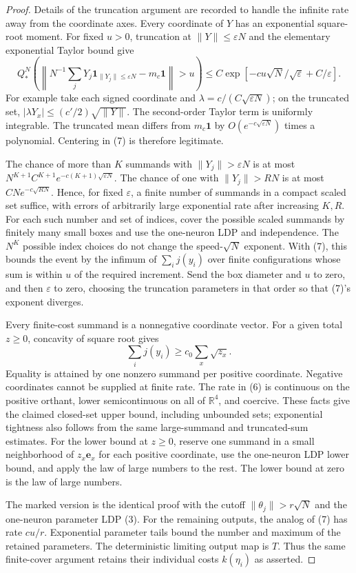 \documentclass[11pt]{article}
\newcommand{\R}{\mathbb R}\newcommand{\one}{\mathbf 1}
\begin{document}
\begin{proof}
Details of the truncation argument are recorded to handle the infinite
rate away from the coordinate axes. Every coordinate of $Y$ has an
exponential square-root moment. For fixed $u>0$, truncation at
$\|Y\|\le\varepsilon N$ and the elementary exponential Taylor bound
give
\[
 Q_*^N\left(\left\|N^{-1}\sum_j
 Y_j\one_{\|Y_j\|\le\varepsilon N}-m_c\one\right\|>u\right)
 \le C\exp[-c u\sqrt N/\sqrt\varepsilon+C/\varepsilon].       \tag{7}
\]
For example take each signed coordinate and
$\lambda=c/(C\sqrt{\varepsilon N})$; on the truncated set,
$|\lambda Y_x|\le(c'/2)\sqrt{\|Y\|}$.
The second-order Taylor term is uniformly integrable. The truncated
mean differs from $m_c\one$ by $O(e^{-c\sqrt{\varepsilon N}})$
times a polynomial. Centering in (7) is therefore legitimate.

The chance of more than $K$ summands with $\|Y_j\|>\varepsilon N$
is at most $N^{K+1}C^{K+1}e^{-c(K+1)\sqrt{\varepsilon N}}$.
The chance of one with $\|Y_j\|>RN$ is at most
$CN e^{-c\sqrt{RN}}$. Hence, for fixed $\varepsilon$, a finite
number of summands in a compact scaled set suffice, with errors of
arbitrarily large exponential rate after increasing $K,R$.
For each such number and set of indices, cover the possible scaled
summands by finitely many small boxes and use the one-neuron LDP
and independence. The $N^K$ possible index choices do not change
the speed-$\sqrt N$ exponent. With (7), this bounds the event by
the infimum of $\sum_i j(y_i)$ over finite configurations whose
sum is within $u$ of the required increment. Send the box diameter
and $u$ to zero, and then $\varepsilon$ to zero, choosing the
truncation parameters in that order so that (7)'s exponent diverges.

Every finite-cost summand is a nonnegative coordinate vector.
For a given total $z\ge0$, concavity of square root gives
\[
 \sum_i j(y_i)\ge c_0\sum_x\sqrt{z_x}.
\]
Equality is attained by one nonzero summand per positive coordinate.
Negative coordinates cannot be supplied at finite rate. The rate
in (6) is continuous on the positive orthant, lower semicontinuous
on all of $\R^4$, and coercive. These facts give the claimed
closed-set upper bound, including unbounded sets; exponential tightness
also follows from the same large-summand and truncated-sum estimates.
For the lower bound at $z\ge0$, reserve one summand in a small
neighborhood of $z_x\mathbf e_x$ for each positive coordinate,
use the one-neuron LDP lower bound, and apply the law of large numbers
to the rest. The lower bound at zero is the law of large numbers.

The marked version is the identical proof with the cutoff
$\|\theta_j\|>r\sqrt N$ and the one-neuron parameter LDP (3).
For the remaining outputs, the analog of (7) has rate $cu/r$.
Exponential parameter tails bound the number and maximum of the
retained parameters. The deterministic limiting output map is $T$.
Thus the same finite-cover argument retains their individual costs
$k(\eta_i)$ as asserted.
\end{proof}
\end{document}

